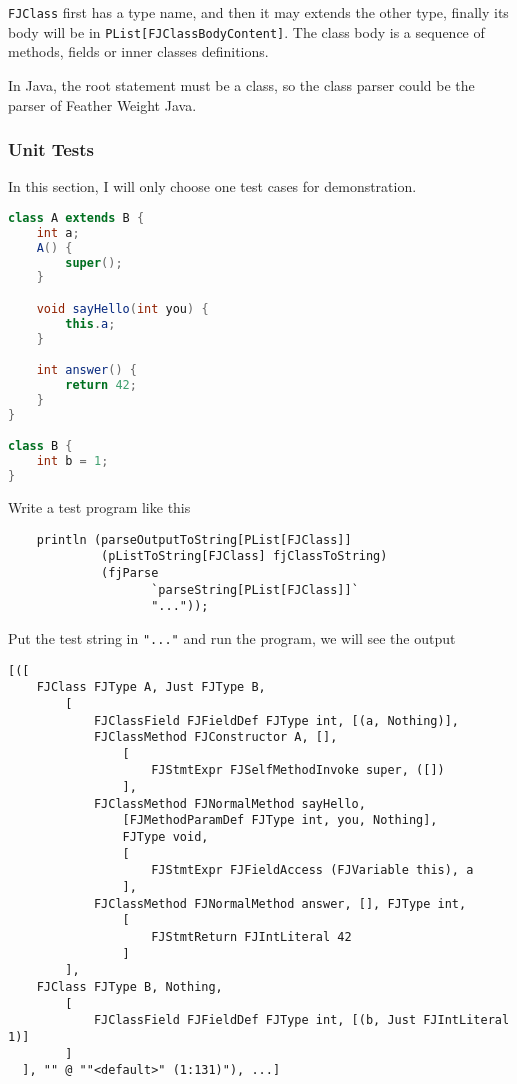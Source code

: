 \texttt{FJClass} first has a type name, and then it may extends the other type, finally its body will be in \texttt{PList[FJClassBodyContent]}. The class body is a sequence of methods, fields or inner classes definitions.

In Java, the root statement must be a class, so the class parser could be the parser of Feather Weight Java.

\subsubsection{Unit Tests}

In this section, I will only choose one test cases for demonstration.

\begin{lstlisting}[language=Java]
class A extends B {
    int a;
    A() {
        super();
    }

    void sayHello(int you) {
        this.a;
    }

    int answer() {
        return 42;
    }
}

class B {
    int b = 1;
}
\end{lstlisting}

Write a test program like this

\begin{lstlisting}
    println (parseOutputToString[PList[FJClass]]
             (pListToString[FJClass] fjClassToString)
             (fjParse
                    `parseString[PList[FJClass]]`
                    "..."));
\end{lstlisting}

Put the test string in \texttt{"..."} and run the program, we will see the output

\begin{lstlisting}
[([
    FJClass FJType A, Just FJType B,
        [
            FJClassField FJFieldDef FJType int, [(a, Nothing)],
            FJClassMethod FJConstructor A, [],
                [
                    FJStmtExpr FJSelfMethodInvoke super, ([])
                ],
            FJClassMethod FJNormalMethod sayHello,
                [FJMethodParamDef FJType int, you, Nothing],
                FJType void,
                [
                    FJStmtExpr FJFieldAccess (FJVariable this), a
                ],
            FJClassMethod FJNormalMethod answer, [], FJType int,
                [
                    FJStmtReturn FJIntLiteral 42
                ]
        ],
    FJClass FJType B, Nothing,
        [
            FJClassField FJFieldDef FJType int, [(b, Just FJIntLiteral 1)]
        ]
  ], "" @ ""<default>" (1:131)"), ...]
\end{lstlisting}


